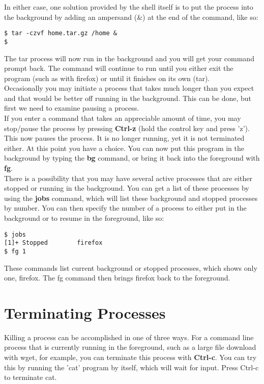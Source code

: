 In either case, one solution provided by the shell itself is to put the process into the background by adding an ampersand (\&) at the end of the command, like so:

\begin{verbatim}
$ tar -czvf home.tar.gz /home &
$
\end{verbatim}

The tar process will now run in the background and you will get your command prompt back.  The command will continue to run until you either exit the program (such as with firefox) or until it finishes on its own (tar).\\

Occasionally you may initiate a process that takes much longer than you expect and that would be better off running in the background.  This can be done, but first we need to examine pausing a process.\\

If you enter a command that takes an appreciable amount of time, you may stop/pause the process by pressing \textbf{Ctrl-z} (hold the control key and press 'z').  This now pauses the process. It is no longer running, yet it is not terminated either.  At this point you have a choice.  You can now put this program in the background by typing the \textbf{bg} command, or bring it back into the foreground with \textbf{fg}.\\

There is a possibility that you may have several active processes that are either stopped or running in the background.  You can get a list of these processes by using the \textbf{jobs} command, which will list these background and stopped processes by number.  You can then specify the number of a process to either put in the background or to resume in the foreground, like so:

\begin{verbatim}
$ jobs
[1]+ Stopped		firefox
$ fg 1
\end{verbatim}

These commands list current background or stopped processes, which shows only one, firefox.  The fg command then brings firefox back to the foreground.

\section{Terminating Processes}

Killing a process can be accomplished in one of three ways.  For a command line process that is currently running in the foreground, such as a large file download with wget, for example, you can terminate this process with \textbf{Ctrl-c}.  You can try this by running the 'cat' program by itself, which will wait for input.  Press Ctrl-c to terminate cat.\\

